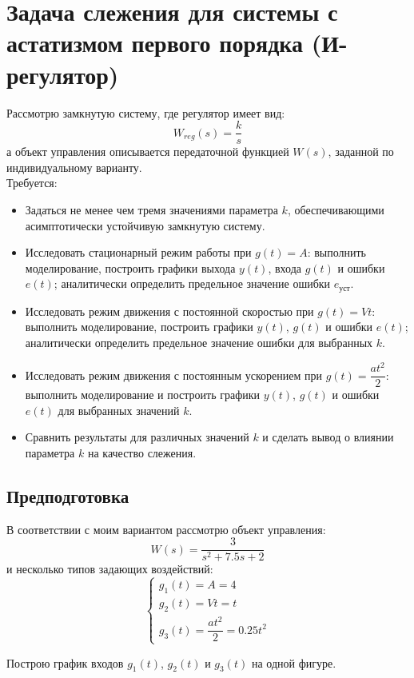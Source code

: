 \documentclass[a4paper,12pt]{article}
\begin{document}
	\newpage
	\section{Задача слежения для системы с астатизмом первого порядка (И-регулятор)}
	
	Рассмотрю замкнутую систему, где регулятор имеет вид:
	\[
	W_{reg}(s) = \frac{k}{s}
	\]
	а объект управления описывается передаточной функцией \(W(s) \), заданной по индивидуальному варианту.\\
	
	Требуется:
	
	\begin{itemize}
		\item Задаться не менее чем тремя значениями параметра \(k\), обеспечивающими асимптотически устойчивую замкнутую систему.
		\item Исследовать стационарный режим работы при \(g(t) = A\): выполнить моделирование, построить графики выхода \(y(t)\), входа \(g(t)\) и ошибки \(e(t)\); аналитически определить предельное значение ошибки \(e_\text{уст}\).
		\item Исследовать режим движения с постоянной скоростью при \(g(t) = V t\): выполнить моделирование, построить графики \(y(t)\), \(g(t)\) и ошибки \(e(t)\); аналитически определить предельное значение ошибки для выбранных \(k\).
		\item Исследовать режим движения с постоянным ускорением при \(g(t) = \dfrac{a t^2}{2}\): выполнить моделирование и построить графики \(y(t)\), \(g(t)\) и ошибки \(e(t)\) для выбранных значений \(k\).
		\item Сравнить результаты для различных значений \(k\) и сделать вывод о влиянии параметра \(k\) на качество слежения.
	\end{itemize}
	
	\subsection{Предподготовка}
	
	В соответствии с моим вариантом рассмотрю объект управления:
	\[
	W(s) = \frac{3}{s^2 + 7.5s + 2}
	\]
	и несколько типов задающих воздействий:
	\[
	\begin{cases}
		g_1(t) = A = 4 \\
		g_2(t) = Vt = t \\
		g_3(t) = \dfrac{at^2}{2} = 0.25t^2
	\end{cases}
	\]
	
	Построю график входов \(g_1(t)\),  \(g_2(t)\) и \(g_3(t)\) на одной фигуре.
	
\end{document}
